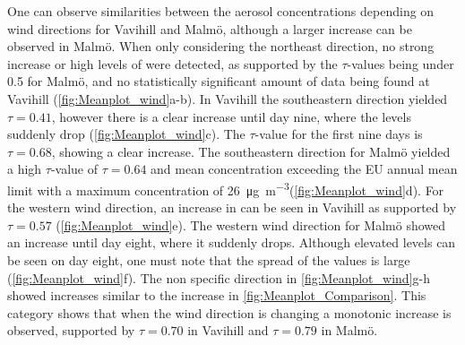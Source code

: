 One can observe similarities between the aerosol concentrations depending on wind directions for Vavihill and Malmö, although a larger increase can be observed in Malmö. When only considering the northeast direction, no strong increase or high levels of \PM were detected, as supported by the $\tau$-values being under 0.5 for Malmö, and no statistically significant amount of data being found at Vavihill (\autoref{fig:Meanplot_wind}a-b). In Vavihill the southeastern direction yielded $\tau=0.41$, however there is a clear increase until day nine, where the levels suddenly drop (\autoref{fig:Meanplot_wind}c). The $\tau$-value for the first nine days is $\tau=0.68$, showing a clear increase. The southeastern direction for Malmö yielded a high $\tau$-value of $\tau=0.64$ and mean concentration exceeding the EU annual mean limit with a maximum concentration of \SI{26}{\micro\gram\per\meter\cubed}(\autoref{fig:Meanplot_wind}d). For the western wind direction, an increase in \PM can be seen in Vavihill as supported by $\tau=0.57$ (\autoref{fig:Meanplot_wind}e). The western wind direction for Malmö showed an increase until day eight, where it suddenly drops. Although elevated levels can be seen on day eight, one must note that the spread of the values is large (\autoref{fig:Meanplot_wind}f). The non specific direction in \autoref{fig:Meanplot_wind}g-h showed increases similar to the increase in \autoref{fig:Meanplot_Comparison}. This category shows that when the wind direction is changing a monotonic increase is observed, supported by $\tau=0.70$ in Vavihill and $\tau=0.79$ in Malmö. 

